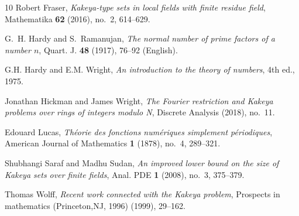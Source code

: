 \begin{thebibliography}{10}
Robert Fraser, \emph{Kakeya-type sets in local fields with finite residue
  field}, Mathematika \textbf{62} (2016), no.~2, 614--629.

G.~H. {Hardy} and S.~{Ramanujan}, \emph{{The normal number of prime factors of
  a number \(n\)}}, {Quart. J.} \textbf{48} (1917), 76--92 (English).

G.H. {Hardy} and E.M. Wright, \emph{An introduction to the theory of numbers},
  4th ed., 1975.

Jonathan Hickman and James Wright, \emph{The {F}ourier restriction and {K}akeya
  problems over rings of integers modulo {N}}, Discrete Analysis (2018),
  no.~11.

Edouard Lucas, \emph{Théorie des fonctions numériques simplement
  périodiques}, American Journal of Mathematics \textbf{1} (1878), no.~4,
  289--321.

Shubhangi Saraf and Madhu Sudan, \emph{An improved lower bound on the size of
  {K}akeya sets over finite fields}, Anal. PDE \textbf{1} (2008), no.~3,
  375--379.

Thomas Wolff, \emph{Recent work connected with the {K}akeya problem}, Prospects
  in mathematics (Princeton,NJ, 1996) (1999), 29--162.

\end{thebibliography}
